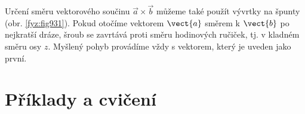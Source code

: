     \begin{mdframed}[style=mdnote]       
      Určení směru vektorového součinu \(\vec{a}\times\vec{b}\) můžeme také použít vývrtky na špunty
      (obr. \ref{fyz:fig931}). Pokud otočíme vektorem \(\vect{a}\) směrem k \(\vect{b}\) po
      nejkratší dráze, šroub se zavrtává proti směru hodinových ručiček, tj. v kladném směru osy
      \(z\). Myšlený pohyb provádíme vždy s vektorem, který je uveden jako první.

      {\centering
        \captionsetup{type=figure} 
        \label{fyz:fig931}
      \par}
    \end{mdframed}

  \section{Příklady a cvičení}\label{fyz:IchapXIsecVIII}
      
      

